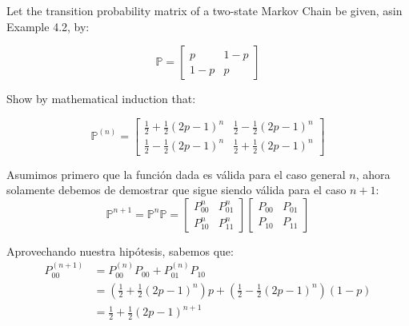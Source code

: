 \documentclass{article}
\begin{document}
            Let the transition probability matrix of a two-state Markov Chain be given, asin Example 4.2, by:

            \begin{equation}
                \mathbb{P} = \begin{bmatrix}
                    p & 1 - p \\
                    1 - p & p
                \end{bmatrix}
            \end{equation}

            Show by mathematical induction that:

            \begin{equation}
                \mathbb{P}^{(n)} = \begin{bmatrix}
                    \frac{1}{2} + \frac{1}{2} (2p - 1)^{n} & \frac{1}{2} - \frac{1}{2} (2p - 1)^{n} \\[2pt]
                    \frac{1}{2} - \frac{1}{2} (2p - 1)^{n} & \frac{1}{2} + \frac{1}{2} (2p - 1)^{n} 
                \end{bmatrix}
            \end{equation}

            Asumimos primero que la función dada es válida para el caso general $n$, ahora solamente debemos de demostrar que sigue siendo válida para el caso $n+1$:
            \begin{equation}
                \mathbb{P}^{n+1} = \mathbb{P}^{n} \mathbb{P} = \begin{bmatrix}
                    P_{00}^{n} & P_{01}^{n} \\
                    P_{10}^{n} & P_{11}^{n}
                \end{bmatrix} \begin{bmatrix}
                    P_{00} & P_{01} \\
                    P_{10} & P_{11}
                \end{bmatrix}
            \end{equation}

            Aprovechando nuestra hipótesis, sabemos que:
            \begin{equation*}
                \begin{split}
                    P_{00}^{(n+1)} &= P_{00}^{(n)} P_{00} + P_{01}^{(n)} P_{10} \\
                    & = \left(\frac{1}{2} + \frac{1}{2} (2p - 1)^{n}\right) p + \left(\frac{1}{2} - \frac{1}{2} (2p - 1)^{n}\right) (1 - p) \\
                    & = \frac{1}{2} + \frac{1}{2} (2p - 1)^{n+1}
                \end{split}
            \end{equation*}
\end{document}
